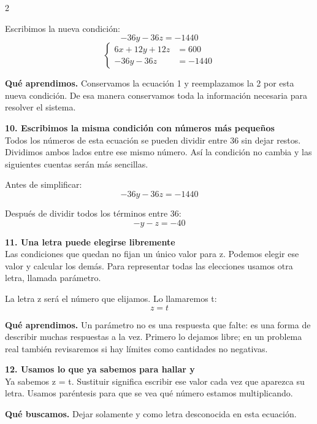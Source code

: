 \documentclass[11pt,a4paper,landscape]{article}
\begin{document}
\begin{multicols*}{2}
\begin{minipage}{\linewidth}
\par\smallskip Escribimos la nueva condición:
\[-36y - 36z = -1440\]
\[\left\{\begin{aligned}6x + 12y + 12z &= 600\\-36y - 36z &= -1440\end{aligned}\right.\]
\par\smallskip\textbf{Qué aprendimos.} Conservamos la ecuación 1 y reemplazamos la 2 por esta nueva condición. De esa manera conservamos toda la información necesaria para resolver el sistema.
\end{minipage}\par\medskip
\noindent\begin{minipage}{\linewidth}\textbf{10. Escribimos la misma condición con números más pequeños}\\[2pt]Todos los números de esta ecuación se pueden dividir entre 36 sin dejar restos. Dividimos ambos lados entre ese mismo número. Así la condición no cambia y las siguientes cuentas serán más sencillas.
\par\smallskip Antes de simplificar:
\[-36y - 36z = -1440\]
\par\smallskip Después de dividir todos los términos entre 36:
\[-y - z = -40\]
\end{minipage}\par\medskip
\noindent\begin{minipage}{\linewidth}\textbf{11. Una letra puede elegirse libremente}\\[2pt]Las condiciones que quedan no fijan un único valor para z. Podemos elegir ese valor y calcular los demás. Para representar todas las elecciones usamos otra letra, llamada parámetro.
\par\smallskip La letra z será el número que elijamos. Lo llamaremos t:
\[z=t\]
\par\smallskip\textbf{Qué aprendimos.} Un parámetro no es una respuesta que falte: es una forma de describir muchas respuestas a la vez. Primero lo dejamos libre; en un problema real también revisaremos si hay límites como cantidades no negativas.
\end{minipage}\par\medskip
\noindent\begin{minipage}{\linewidth}\textbf{12. Usamos lo que ya sabemos para hallar y}\\[2pt]Ya sabemos z = t. Sustituir significa escribir ese valor cada vez que aparezca su letra. Usamos paréntesis para que se vea qué número estamos multiplicando.
\par\smallskip\textbf{Qué buscamos.} Dejar solamente y como letra desconocida en esta ecuación.

\end{minipage}
\end{multicols*}
\end{document}
